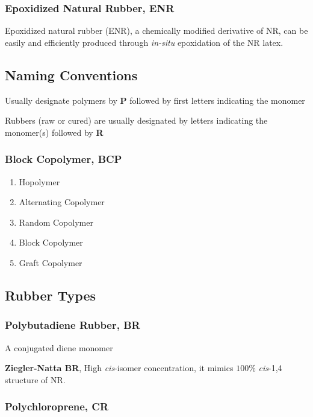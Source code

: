 \documentclass{NoteThesis/note-thesis}
\begin{document}
\subsubsection*{Epoxidized Natural Rubber, ENR}

Epoxidized natural rubber (ENR), a chemically modified derivative of NR, can be easily and efficiently produced through \textit{in-situ} epoxidation of the NR latex.


\subsection{Naming Conventions}

Usually designate polymers by \textbf{P} followed by first letters indicating the monomer

Rubbers (raw or cured) are usually designated by letters indicating the monomer(s) followed by \textbf{R}

\subsubsection*{Block Copolymer, BCP}

\begin{enumerate}
    \item Hopolymer
    \item Alternating Copolymer
    \item Random Copolymer
    \item Block Copolymer
    \item Graft Copolymer
\end{enumerate}

\subsection{Rubber Types}

\subsubsection*{Polybutadiene Rubber, BR}

A conjugated diene monomer


\textbf{Ziegler-Natta BR}, High \textit{cis}-isomer concentration, it mimics $100\%$ \textit{cis}-1,4 structure of NR.

\subsubsection*{Polychloroprene, CR}
\end{document}
